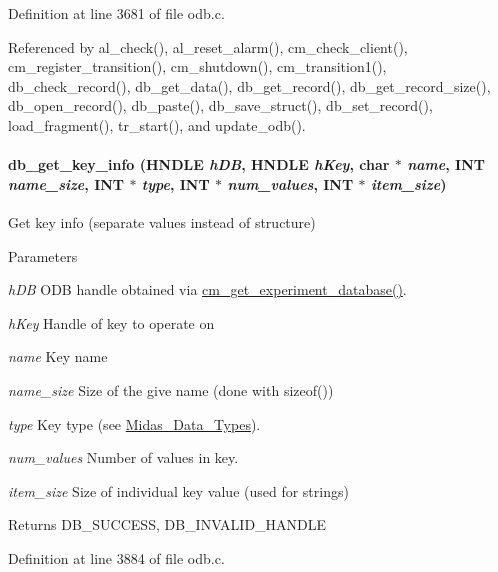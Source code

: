 Definition at line 3681 of file odb.c.

Referenced by al\_\-check(), al\_\-reset\_\-alarm(), cm\_\-check\_\-client(), cm\_\-register\_\-transition(), cm\_\-shutdown(), cm\_\-transition1(), db\_\-check\_\-record(), db\_\-get\_\-data(), db\_\-get\_\-record(), db\_\-get\_\-record\_\-size(), db\_\-open\_\-record(), db\_\-paste(), db\_\-save\_\-struct(), db\_\-set\_\-record(), load\_\-fragment(), tr\_\-start(), and update\_\-odb().
\paragraph[{db\_\-get\_\-key\_\-info}]{ db\_\-get\_\-key\_\-info (HNDLE {\em hDB}, \/  HNDLE {\em hKey}, \/  char $\ast$ {\em name}, \/  {\bf INT} {\em name\_\-size}, \/  {\bf INT} $\ast$ {\em type}, \/  {\bf INT} $\ast$ {\em num\_\-values}, \/  {\bf INT} $\ast$ {\em item\_\-size})}\hfill\label{group__odbfunctionc_ga34deb0b63c67d73975017e47270a5ca9}
Get key info (separate values instead of structure) 
\begin{DoxyParams}{Parameters}
\item[{\em hDB}]ODB handle obtained via \hyperlink{group__cmfunctionc_ga16b33b70783a3f5ba98b4094149d12b7}{cm\_\-get\_\-experiment\_\-database()}. \item[{\em hKey}]Handle of key to operate on \item[{\em name}]Key name \item[{\em name\_\-size}]Size of the give name (done with sizeof()) \item[{\em type}]Key type (see \hyperlink{F_Midas_Code_and_Libraries_Midas_Data_Types}{Midas\_\-Data\_\-Types}). \item[{\em num\_\-values}]Number of values in key. \item[{\em item\_\-size}]Size of individual key value (used for strings) \end{DoxyParams}
\begin{DoxyReturn}{Returns}
DB\_\-SUCCESS, DB\_\-INVALID\_\-HANDLE 
\end{DoxyReturn}


Definition at line 3884 of file odb.c.
